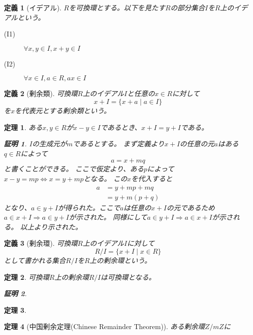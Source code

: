 \documentclass[uplatex, 11pt, a4j, dvipdfmx]{jsarticle}
\newtheorem{dfn}{定義}
\newtheorem{thm}{定理}
\newtheorem{prf}{証明}
\begin{document}
  \begin{dfn}[イデアル]
    $R$を可換環とする。以下を見たす$R$の部分集合$I$を$R$上のイデアルという。
    \begin{description}
      \item[(I1)] $\forall x, y\in I, x + y \in I$
      \item[(I2)] $\forall x\in I, a \in R, a x \in I$
    \end{description}
  \end{dfn}

  \begin{dfn}[剰余類]
    可換環$R$上のイデアル$I$と任意の$x \in R$に対して
    \begin{equation}
      x + I = \{ x + a \mid a \in I \}
    \end{equation}
    を$x$を代表元とする剰余類という。
  \end{dfn}

  \begin{thm}
    ある$x, y \in R$が$x - y \in I$であるとき、$x + I = y + I$である。
    \begin{prf}
      $I$の生成元が$m$であるとする。
      まず定義より$x + I$の任意の元$a$はある$q \in R$によって
      \begin{equation}
        a = x + m q
      \end{equation}
      と書くことができる。
      ここで仮定より、ある$p$によって$x - y = m p \Leftrightarrow x = y + m p$となる。
      この$x$を代入すると
      \begin{align}
        a &= y + m p + m q \\
          &= y + m (p + q)
      \end{align}
      となり、$a \in y + I$が得られた。ここで$a$は任意の$x + I$の元であるため$a \in x + I \Rightarrow a \in y + I$が示された。
      同様にして$a \in y + I \Rightarrow a \in x + I$が示される。
      以上より示された。
    \end{prf}
  \end{thm}



  \begin{dfn}[剰余環]
    可換環$R$上のイデアル$I$に対して
    \begin{equation}
      R/I = \{ x + I \mid x \in R \}
    \end{equation}
    として書かれる集合$R/I$を$R$上の剰余環という。
  \end{dfn}

  \begin{thm}
    可換環$R$上の剰余環$R/I$は可換環となる。
    \begin{prf}
    \end{prf}
  \end{thm}


  \begin{thm}
  \end{thm}


  \begin{thm}[中国剰余定理(Chinese Remainder Theorem)]
    ある剰余環$Z/mZ$に
  \end{thm}
\end{document}
